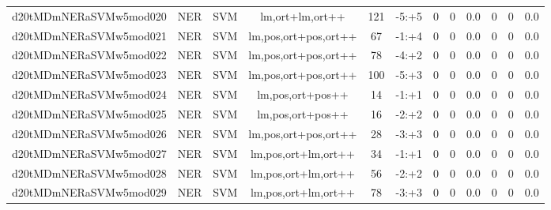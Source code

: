 \documentclass[a4paper]{article}
\begin{document}
\begin{landscape}
\begin{center}
\begin{tabular}{ |c|c|c|c|c|c|c|c|c|c|c|c|}
 
 	
 	\small{ d20tMDmNERaSVMw5mod020 } & \small{ NER} & \small{  SVM }  & lm,ort+lm,ort++  &  121 &  \small{  -5:+5 }  &  0 & 0 & 0.0  &  0 & 0 & 0.0 \\
 	

 
 	
 	\small{ d20tMDmNERaSVMw5mod021 } & \small{ NER} & \small{  SVM }  & lm,pos,ort+pos,ort++  &  67 &  \small{  -1:+4 }  &  0 & 0 & 0.0  &  0 & 0 & 0.0 \\
 	

 
 	
 	\small{ d20tMDmNERaSVMw5mod022 } & \small{ NER} & \small{  SVM }  & lm,pos,ort+pos,ort++  &  78 &  \small{  -4:+2 }  &  0 & 0 & 0.0  &  0 & 0 & 0.0 \\
 	

 
 	
 	\small{ d20tMDmNERaSVMw5mod023 } & \small{ NER} & \small{  SVM }  & lm,pos,ort+pos,ort++  &  100 &  \small{  -5:+3 }  &  0 & 0 & 0.0  &  0 & 0 & 0.0 \\
 	

 
 	
 	\small{ d20tMDmNERaSVMw5mod024 } & \small{ NER} & \small{  SVM }  & lm,pos,ort+pos++  &  14 &  \small{  -1:+1 }  &  0 & 0 & 0.0  &  0 & 0 & 0.0 \\
 	

 
 	
 	\small{ d20tMDmNERaSVMw5mod025 } & \small{ NER} & \small{  SVM }  & lm,pos,ort+pos++  &  16 &  \small{  -2:+2 }  &  0 & 0 & 0.0  &  0 & 0 & 0.0 \\
 	

 
 	
 	\small{ d20tMDmNERaSVMw5mod026 } & \small{ NER} & \small{  SVM }  & lm,pos,ort+pos,ort++  &  28 &  \small{  -3:+3 }  &  0 & 0 & 0.0  &  0 & 0 & 0.0 \\
 	

 
 	
 	\small{ d20tMDmNERaSVMw5mod027 } & \small{ NER} & \small{  SVM }  & lm,pos,ort+lm,ort++  &  34 &  \small{  -1:+1 }  &  0 & 0 & 0.0  &  0 & 0 & 0.0 \\
 	

 
 	
 	\small{ d20tMDmNERaSVMw5mod028 } & \small{ NER} & \small{  SVM }  & lm,pos,ort+lm,ort++  &  56 &  \small{  -2:+2 }  &  0 & 0 & 0.0  &  0 & 0 & 0.0 \\
 	

 
 	
 	\small{ d20tMDmNERaSVMw5mod029 } & \small{ NER} & \small{  SVM }  & lm,pos,ort+lm,ort++  &  78 &  \small{  -3:+3 }  &  0 & 0 & 0.0  &  0 & 0 & 0.0 \\
 	


\end{tabular}
\end{center}
\end{landscape}
\end{document}
